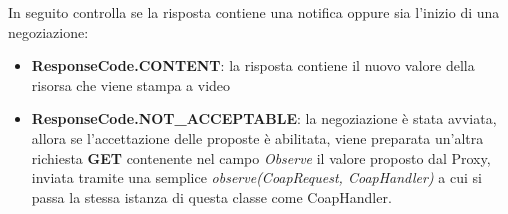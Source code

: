 				In seguito controlla se la risposta contiene una notifica oppure sia l'inizio di una negoziazione:
				\begin{itemize}
					\item \textbf{ResponseCode.CONTENT}: la risposta contiene il nuovo valore della risorsa che viene stampa a video
					\item \textbf{ResponseCode.NOT\_ACCEPTABLE}: la negoziazione è stata avviata, allora se l'accettazione delle proposte è abilitata, viene preparata un'altra richiesta \textbf{GET} contenente nel campo \textit{Observe} il valore proposto dal Proxy, inviata tramite una semplice \textit{observe(CoapRequest, CoapHandler)} a cui si passa la stessa istanza di questa classe come CoapHandler.
				\end{itemize}
				
